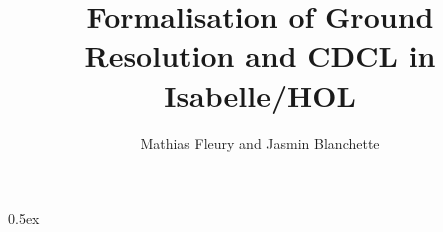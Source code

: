 \documentclass[11pt,a4paper]{book}
\begin{document}
\title{Formalisation of Ground Resolution and CDCL in Isabelle/HOL}
\author{Mathias Fleury and Jasmin Blanchette}
\maketitle

\tableofcontents

\parindent 0pt\parskip 0.5ex



%
%
\end{document}
